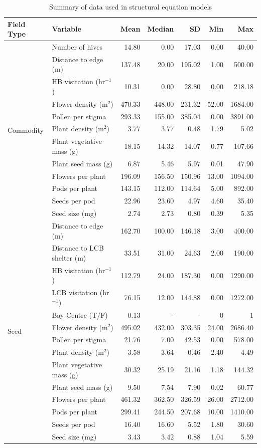 \begin{table}[ht]
\caption{Summary of data used in structural equation models}
\centering
\begin{tabular}{l|lrrrrr}
  \hline
Field Type & Variable & Mean & Median & SD & Min & Max \\ 
    \hline
\multirow{12}{*}{Commodity} & Number of hives & 14.80 & 0.00 & 17.03 & 0.00 & 40.00 \\ 
   & Distance to edge (m) & 137.48 & 20.00 & 195.02 & 1.00 & 500.00 \\ 
   & HB visitation (hr$^{-1}$) & 10.31 & 0.00 & 28.80 & 0.00 & 218.18 \\ 
   & Flower density (m$^2$) & 470.33 & 448.00 & 231.32 & 52.00 & 1684.00 \\ 
   & Pollen per stigma & 293.33 & 155.00 & 385.04 & 0.00 & 3891.00 \\ 
   & Plant density (m$^2$) & 3.77 & 3.77 & 0.48 & 1.79 & 5.02 \\ 
   & Plant vegetative mass (g) & 18.15 & 14.32 & 14.07 & 0.77 & 107.66 \\ 
   & Plant seed mass (g) & 6.87 & 5.46 & 5.97 & 0.01 & 47.90 \\ 
   & Flowers per plant & 196.09 & 156.50 & 150.96 & 13.00 & 1094.00 \\ 
   & Pods per plant & 143.15 & 112.00 & 114.64 & 5.00 & 892.00 \\ 
   & Seeds per pod & 22.96 & 23.60 & 4.97 & 4.60 & 35.40 \\ 
   & Seed size (mg) & 2.74 & 2.73 & 0.80 & 0.39 & 5.35 \\ \hline
  \multirow{14}{*}{Seed} & Distance to edge (m) & 162.70 & 100.00 & 146.18 & 3.00 & 400.00 \\ 
   & Distance to LCB shelter (m) & 33.51 & 31.00 & 24.63 & 2.00 & 190.00 \\ 
   & HB visitation (hr$^{-1}$) & 112.79 & 24.00 & 187.30 & 0.00 & 1290.00 \\ 
   & LCB visitation (hr$^{-1}$) & 76.15 & 12.00 & 144.88 & 0.00 & 1272.00 \\ 
   & Bay Centre (T/F) & 0.13 & - & - & 0 & 1 \\ 
   & Flower density (m$^2$) & 495.02 & 432.00 & 303.35 & 24.00 & 2686.40 \\ 
   & Pollen per stigma & 21.76 & 7.00 & 42.53 & 0.00 & 578.00 \\ 
   & Plant density (m$^2$) & 3.58 & 3.64 & 0.46 & 2.40 & 4.49 \\ 
   & Plant vegetative mass (g) & 30.32 & 25.19 & 21.16 & 1.18 & 144.32 \\ 
   & Plant seed mass (g) & 9.50 & 7.54 & 7.90 & 0.02 & 60.77 \\ 
   & Flowers per plant & 461.32 & 362.50 & 326.59 & 26.00 & 2712.00 \\ 
   & Pods per plant & 299.41 & 244.50 & 207.68 & 10.00 & 1410.00 \\ 
   & Seeds per pod & 16.40 & 16.60 & 5.52 & 1.80 & 30.60 \\ 
   & Seed size (mg) & 3.43 & 3.42 & 0.88 & 1.04 & 5.59 \\
\end{tabular}
\label{tab:dataSummary}
\end{table}


